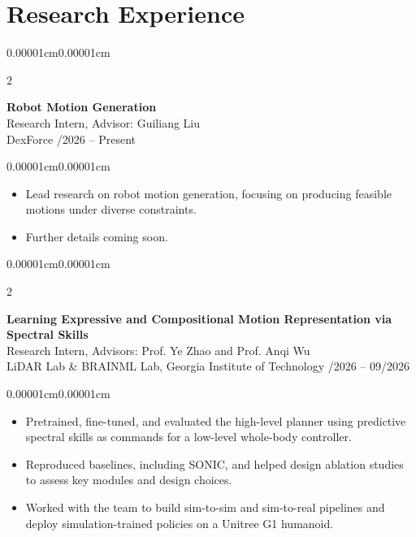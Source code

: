 \documentclass[10pt,letterpaper]{article}
\newenvironment{highlights}{\begin{itemize}[topsep=0.09cm,parsep=0pt,partopsep=0pt,itemsep=0.04cm,leftmargin=0.4cm]}{\end{itemize}}
\newenvironment{onecolentry}{\begin{adjustwidth}{0.00001cm}{0.00001cm}}{\end{adjustwidth}}
\newenvironment{twocolentry}[2][]{%
  \onecolentry
  \def\secondColumn{#2}
  \setcolumnwidth{\fill,3.7cm}
  \begin{paracol}{2}
}{%
  \switchcolumn\raggedleft\secondColumn
  \end{paracol}
  \endonecolentry
}
\begin{document}
\section{Research Experience}
\begin{twocolentry}{01/2026 -- Present}
  \textbf{Robot Motion Generation}\\
  Research Intern, Advisor: Guiliang Liu\\
  DexForce
\end{twocolentry}
\begin{onecolentry}
  \begin{highlights}
    \item Lead research on robot motion generation, focusing on producing feasible motions under diverse constraints.
    \item Further details coming soon.
  \end{highlights}
\end{onecolentry}
\vspace{0.16cm}

\begin{twocolentry}{06/2026 -- 09/2026}
  \textbf{Learning Expressive and Compositional Motion Representation via Spectral Skills}\\
  Research Intern, Advisors: Prof. Ye Zhao and Prof. Anqi Wu\\
  LiDAR Lab \& BRAINML Lab, Georgia Institute of Technology
\end{twocolentry}
\begin{onecolentry}
  \begin{highlights}
    \item Pretrained, fine-tuned, and evaluated the high-level planner using predictive spectral skills as commands for a low-level whole-body controller.
    \item Reproduced baselines, including SONIC, and helped design ablation studies to assess key modules and design choices.
    \item Worked with the team to build sim-to-sim and sim-to-real pipelines and deploy simulation-trained policies on a Unitree G1 humanoid.
  \end{highlights}
\end{onecolentry}
\vspace{0.16cm}
\end{document}
